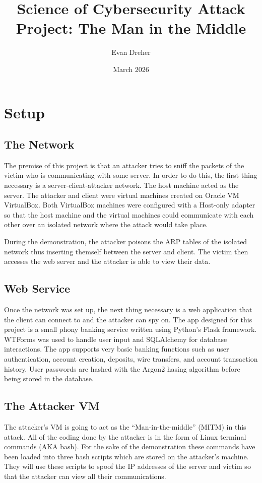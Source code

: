 \documentclass[11pt]{article}
\author{Evan Dreher}
\date{March 2026}
\title{Science of Cybersecurity Attack Project: The Man in the Middle}
\begin{document}
\maketitle

\section{Setup}

\subsection{The Network}
\par The premise of this project is that an attacker tries to sniff the packets of the victim who is communicating with some server. In order to do this, the first thing necessary is a server-client-attacker network. The host machine acted as the server. The attacker and client were virtual machines created on Oracle VM VirtualBox. Both VirtualBox machines were configured with a Host-only adapter so that the host machine and the virtual machines could communicate with each other over an isolated network where the attack would take place.

\par During the demonstration, the attacker poisons the ARP tables of the isolated network thus inserting themself between the server and client. The victim then accesses the web server and the attacker is able to view their data.

\subsection{Web Service}
\par Once the network was set up, the next thing necessary is a web application that the client can connect to and the attacker can spy on.  The app designed for this project is a small phony banking service written using Python's Flask framework. WTForms was used to handle user input and SQLAlchemy for database interactions. The app supports very basic banking functions such as user authentication, account creation, deposits, wire transfers, and account transaction history. User passwords are hashed with the Argon2 hasing algorithm before being stored in the database.

\subsection{The Attacker VM}
\par The attacker's VM is going to act as the ``Man-in-the-middle'' (MITM) in this attack. All of the coding done by the attacker is in the form of Linux terminal commands (AKA bash). For the sake of the demonstration these commands have been loaded into three bash scripts which are stored on the attacker's machine. They will use these scripts to spoof the IP addresses of the server and victim so that the attacker can view all their communications.
\end{document}
